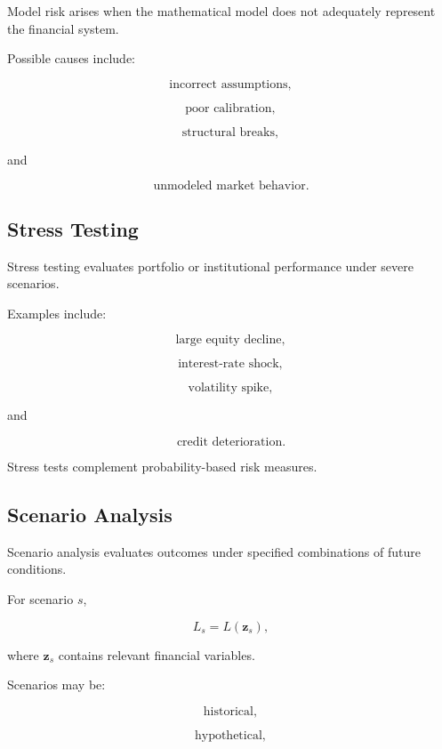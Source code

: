 Model risk arises when the mathematical model does not adequately represent
the financial system.

Possible causes include:

\[
\boxed{
\text{incorrect assumptions},
}
\]

\[
\boxed{
\text{poor calibration},
}
\]

\[
\boxed{
\text{structural breaks},
}
\]

and

\[
\boxed{
\text{unmodeled market behavior}.
}
\]

\subsection{Stress Testing}
\label{subsec:financial-stress-testing}

Stress testing evaluates portfolio or institutional performance under severe
scenarios.

Examples include:

\[
\boxed{
\text{large equity decline},
}
\]

\[
\boxed{
\text{interest-rate shock},
}
\]

\[
\boxed{
\text{volatility spike},
}
\]

and

\[
\boxed{
\text{credit deterioration}.
}
\]

Stress tests complement probability-based risk measures.

\subsection{Scenario Analysis}
\label{subsec:financial-scenario-analysis}

Scenario analysis evaluates outcomes under specified combinations of future
conditions.

For scenario \(s\),

\[
\boxed{
L_s
=
L(\mathbf{z}_s),
}
\]

where \(\mathbf{z}_s\) contains relevant financial variables.

Scenarios may be:

\[
\boxed{
\text{historical},
}
\]

\[
\boxed{
\text{hypothetical},
}
\]

